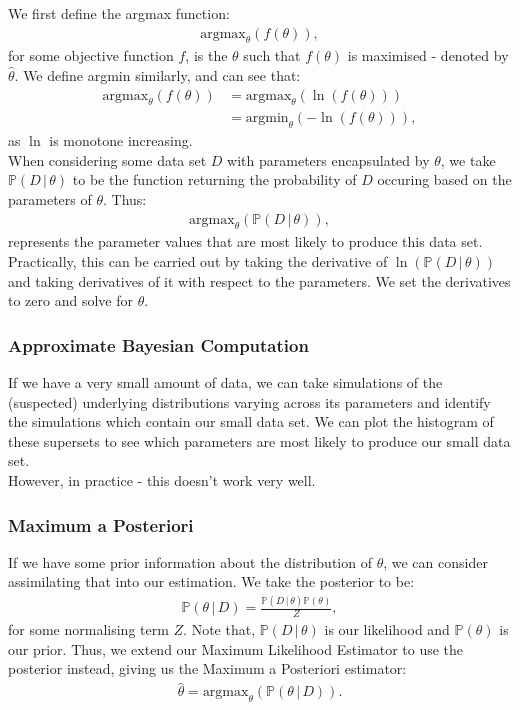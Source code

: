 We first define the argmax function:
\begin{gather*}
    \text{argmax}_\theta(f(\theta)),
\end{gather*} for some objective function $f$, is the $\theta$
such that $f(\theta)$ is maximised - denoted by $\hat\theta$.
We define argmin similarly, and can see that:
\begin{align*}
    \text{argmax}_\theta(f(\theta)) 
    &= \text{argmax}_\theta(\ln(f(\theta))) \\
    &= \text{argmin}_\theta(-\ln(f(\theta))),
\end{align*} as $\ln$ is monotone increasing.
\\[\baselineskip]
When considering some data set $D$ with parameters
encapsulated by $\theta$, we take $\mathbb{P}(D \, | \, \theta)$ 
to be the function returning the probability of $D$ occuring based 
on the parameters of $\theta$. Thus: \begin{gather*}
    \text{argmax}_\theta(\mathbb{P}(D \, | \, \theta)),
\end{gather*} represents the parameter values that
are most likely to produce this data set. Practically,
this can be carried out by taking the derivative of
$\ln(\mathbb{P}(D \, | \, \theta))$ and taking derivatives 
of it with respect to the parameters. We set the derivatives
to zero and solve for $\theta$.

\subsubsection{Approximate Bayesian Computation}

If we have a very small amount of data, we can take simulations
of the (suspected) underlying distributions varying across its
parameters and identify the simulations which contain our small
data set. We can plot the histogram of these supersets to see
which parameters are most likely to produce our small data set.
\\[\baselineskip]
However, in practice - this doesn't work very well.

\subsubsection{Maximum a Posteriori}

If we have some prior information about the distribution of
$\theta$, we can consider assimilating that into our estimation.
We take the posterior to be: \begin{gather*}
    \mathbb{P}(\theta \, | \, D) 
    = \frac{
        \mathbb{P}(D \, | \, \theta)\mathbb{P}(\theta)
        }{Z},
\end{gather*} for some normalising term $Z$. Note that,
$\mathbb{P}(D \, | \, \theta)$ is our likelihood and 
$\mathbb{P}(\theta)$ is our prior. Thus, we extend
our Maximum Likelihood Estimator to use the posterior instead,
giving us the Maximum a Posteriori estimator: \begin{gather*}
    \hat\theta = \text{argmax}_\theta(\mathbb{P}(\theta \, | \, D)).
\end{gather*}